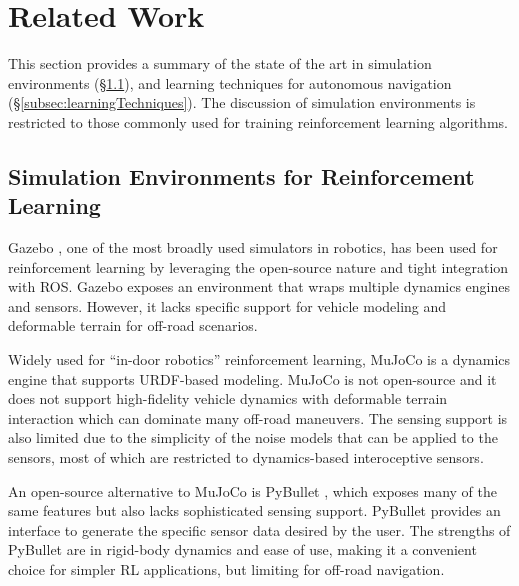 
\section{Related Work}
\label{sec:relatedWork}


This section provides a summary of the state of the art in simulation environments (\S\ref{subsec:simEnvironments}), and learning techniques for autonomous navigation (\S\ref{subsec:learningTechniques}). The discussion of simulation environments is restricted to those commonly used for training reinforcement learning algorithms.

\subsection{Simulation Environments for Reinforcement Learning}
\label{subsec:simEnvironments}

Gazebo \cite{koenig2004design}, one of the most broadly used simulators in robotics, has been used for reinforcement learning by leveraging the open-source nature and tight integration with ROS. Gazebo exposes an environment that wraps multiple dynamics engines and sensors. However, it lacks specific support for vehicle modeling and deformable terrain for off-road scenarios.

Widely used for ``in-door robotics'' reinforcement learning, MuJoCo \cite{todorovMujoco2012} is a dynamics engine that supports URDF-based modeling. MuJoCo is not open-source and it does not support high-fidelity vehicle dynamics with deformable terrain interaction which can dominate many off-road maneuvers. The sensing support is also limited due to the simplicity of the noise models that can be applied to the sensors, most of which are restricted to dynamics-based interoceptive sensors. 

An open-source alternative to MuJoCo is PyBullet \cite{matas2018simtoreal}, which exposes many of the same features but also lacks sophisticated sensing support. PyBullet provides an interface to generate the specific sensor data desired by the user. The strengths of PyBullet are in rigid-body dynamics and ease of use, making it a convenient choice for simpler RL applications, but limiting for off-road navigation.

